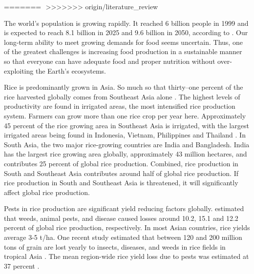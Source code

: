 \documentclass[12pt, oneside]{report}
\begin{document}
=======
﻿%
>>>>>>> origin/literature_review


The world's population is growing rapidly. It reached 6 billion people in 1999 and is expected to reach 8.1 billion in 2025 and 9.6 billion in 2050, according to \citet{un2013world}. Our long-term ability to meet growing demands for food seems uncertain. Thus, one of the greatest challenges is increasing food production in a sustainable manner so that everyone can have adequate food and proper nutrition without over-exploiting the Earth's ecosystems. 

Rice is predominantly grown in Asia. So much so that thirty--one percent of the rice harvested globally comes from Southeast Asia alone \citep{oecd2012oecd}. The highest levels of productivity are found in irrigated areas, the most intensified rice production system. Farmers can grow more than one rice crop per year here. Approximately 45 percent of the rice growing area in Southeast Asia is irrigated, with the largest irrigated areas being found in Indonesia, Vietnam, Philippines and Thailand \citep{mutert2002developments}. In South Asia, the two major rice-growing countries are India and Bangladesh. India has the largest rice growing area globally, approximately 43 million hectares, and contributes 25 percent of global rice production. Combined, rice production in South and Southeast Asia contributes around half of global rice production. If rice production in South and Southeast Asia is threatened, it will significantly affect global rice production. 

Pests in rice production are significant yield reducing factors globally. \citet{OERKE:2006ct} estimated that weeds, animal pests, and disease caused losses around 10.2, 15.1 and 12.2 percent of global rice production, respectively. In most Asian countries, rice yields average 3-5 t/ha. One recent study estimated that between 120 and 200 million tons of grain are lost yearly to insects, diseases, and weeds in rice fields in tropical Asia \citep{willocquet2004research}. The mean region-wide rice yield loss due to pests was estimated at 37 percent \citep{Savary:2000vr}.
\end{document}
